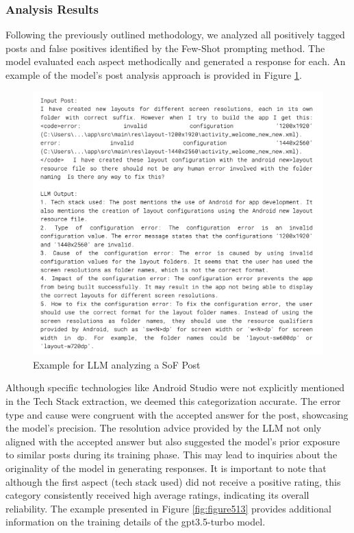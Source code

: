 \documentclass[english,bachelor]{swsLeipzig}
\begin{document}
\subsubsection{Analysis Results}

Following the previously outlined methodology, we analyzed all positively tagged posts and false positives identified by the Few-Shot prompting method. The model evaluated each aspect methodically and generated a response for each. An example of the model's post analysis approach is provided in Figure \ref{fig:figure512}.

\begin{figure}[h]
  \centering
  \includegraphics[width=1\textwidth]{images/analysisres.png}
  \caption{Example for LLM analyzing a SoF Post}
  \label{fig:figure512}
\end{figure}

Although specific technologies like Android Studio were not explicitly mentioned in the Tech Stack 
extraction, we deemed this categorization accurate. The error type and cause were congruent with the accepted answer for the post, showcasing the model's precision. The resolution advice provided by the LLM not only aligned with the accepted answer but also suggested the model's prior exposure to similar posts during its training phase. This may lead to inquiries about the originality of the model in generating responses. It is important to note that although the first aspect (tech stack used) did not receive a positive rating, this category consistently received high average ratings, indicating its overall reliability. The example presented in Figure \ref{fig:figure513} provides additional information on the training details of the gpt3.5-turbo model.
\end{document}
